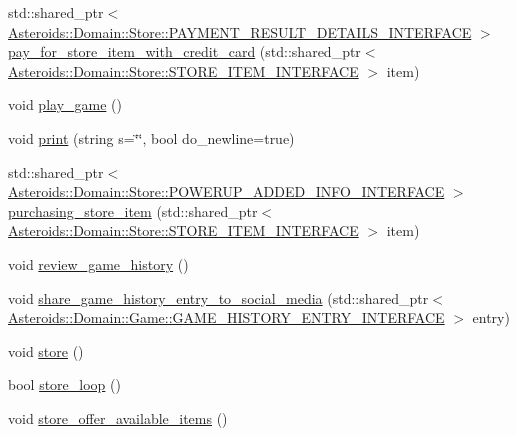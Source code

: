 \begin{DoxyCompactItemize}
\item 
std\+::shared\+\_\+ptr$<$ \hyperlink{classAsteroids_1_1Domain_1_1Store_1_1PAYMENT__RESULT__DETAILS__INTERFACE}{Asteroids\+::\+Domain\+::\+Store\+::\+P\+A\+Y\+M\+E\+N\+T\+\_\+\+R\+E\+S\+U\+L\+T\+\_\+\+D\+E\+T\+A\+I\+L\+S\+\_\+\+I\+N\+T\+E\+R\+F\+A\+CE} $>$ \hyperlink{classAsteroids_1_1UI_1_1ClientTextUI_1_1ClientTextUI_a02d420d49c44459fe7a2af9b0000adf9}{pay\+\_\+for\+\_\+store\+\_\+item\+\_\+with\+\_\+credit\+\_\+card} (std\+::shared\+\_\+ptr$<$ \hyperlink{classAsteroids_1_1Domain_1_1Store_1_1STORE__ITEM__INTERFACE}{Asteroids\+::\+Domain\+::\+Store\+::\+S\+T\+O\+R\+E\+\_\+\+I\+T\+E\+M\+\_\+\+I\+N\+T\+E\+R\+F\+A\+CE} $>$ item)
\item 
void \hyperlink{classAsteroids_1_1UI_1_1ClientTextUI_1_1ClientTextUI_aa0cb16ae0f3edc7efed1ec8c5d7bf94d}{play\+\_\+game} ()
\item 
void \hyperlink{classAsteroids_1_1UI_1_1ClientTextUI_1_1ClientTextUI_a41f904ea570af3e3a8c4d70da8411ef3}{print} (string s=\char`\"{}\char`\"{}, bool do\+\_\+newline=true)
\item 
std\+::shared\+\_\+ptr$<$ \hyperlink{classAsteroids_1_1Domain_1_1Store_1_1POWERUP__ADDED__INFO__INTERFACE}{Asteroids\+::\+Domain\+::\+Store\+::\+P\+O\+W\+E\+R\+U\+P\+\_\+\+A\+D\+D\+E\+D\+\_\+\+I\+N\+F\+O\+\_\+\+I\+N\+T\+E\+R\+F\+A\+CE} $>$ \hyperlink{classAsteroids_1_1UI_1_1ClientTextUI_1_1ClientTextUI_a469a7cd3423794fa0ca7c34d95db5a10}{purchasing\+\_\+store\+\_\+item} (std\+::shared\+\_\+ptr$<$ \hyperlink{classAsteroids_1_1Domain_1_1Store_1_1STORE__ITEM__INTERFACE}{Asteroids\+::\+Domain\+::\+Store\+::\+S\+T\+O\+R\+E\+\_\+\+I\+T\+E\+M\+\_\+\+I\+N\+T\+E\+R\+F\+A\+CE} $>$ item)
\item 
void \hyperlink{classAsteroids_1_1UI_1_1ClientTextUI_1_1ClientTextUI_a27ec39f73edbb3688a3ebe67533abf5a}{review\+\_\+game\+\_\+history} ()
\item 
void \hyperlink{classAsteroids_1_1UI_1_1ClientTextUI_1_1ClientTextUI_ab0a3f9e22046b77a85dc7771d3502365}{share\+\_\+game\+\_\+history\+\_\+entry\+\_\+to\+\_\+social\+\_\+media} (std\+::shared\+\_\+ptr$<$ \hyperlink{classAsteroids_1_1Domain_1_1Game_1_1GAME__HISTORY__ENTRY__INTERFACE}{Asteroids\+::\+Domain\+::\+Game\+::\+G\+A\+M\+E\+\_\+\+H\+I\+S\+T\+O\+R\+Y\+\_\+\+E\+N\+T\+R\+Y\+\_\+\+I\+N\+T\+E\+R\+F\+A\+CE} $>$ entry)
\item 
void \hyperlink{classAsteroids_1_1UI_1_1ClientTextUI_1_1ClientTextUI_ae228a731be242ef0cf88005c2c03acee}{store} ()
\item 
bool \hyperlink{classAsteroids_1_1UI_1_1ClientTextUI_1_1ClientTextUI_a66aab545b0cd59af6bec829a1b82be89}{store\+\_\+loop} ()
\item 
void \hyperlink{classAsteroids_1_1UI_1_1ClientTextUI_1_1ClientTextUI_a9175792a129c214f55dd0bda9ac36b33}{store\+\_\+offer\+\_\+available\+\_\+items} ()
\end{DoxyCompactItemize}

